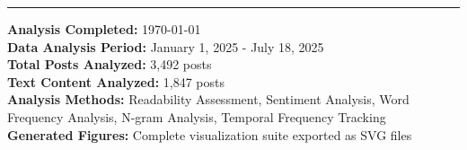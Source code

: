 \documentclass[12pt,a4paper]{article}
\begin{document}
\hrule

\vspace{0.5cm}

\textbf{Analysis Completed:} \today \\
\textbf{Data Analysis Period:} January 1, 2025 - July 18, 2025 \\
\textbf{Total Posts Analyzed:} 3,492 posts \\
\textbf{Text Content Analyzed:} 1,847 posts \\
\textbf{Analysis Methods:} Readability Assessment, Sentiment Analysis, Word Frequency Analysis, N-gram Analysis, Temporal Frequency Tracking \\
\textbf{Generated Figures:} Complete visualization suite exported as SVG files
\end{document}
